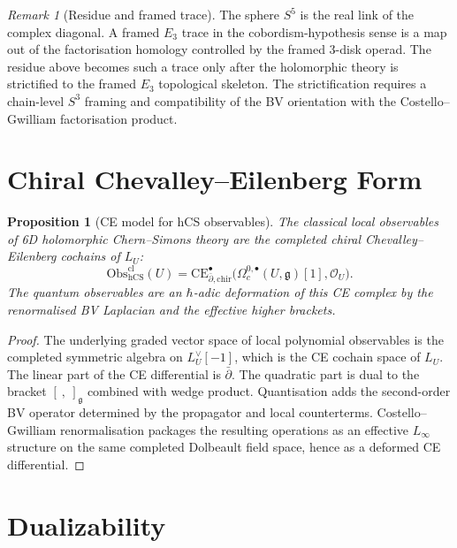 \documentclass[11pt]{amsart}
\providecommand{\hb}{\hbar}
\providecommand{\dbar}{\bar{\partial}}
\providecommand{\Obs}{\mathrm{Obs}}
\providecommand{\hCS}{\mathrm{hCS}}
\providecommand{\CE}{\mathrm{CE}}
\providecommand{\chir}{\mathrm{chir}}
\providecommand{\cO}{\mathcal{O}}
\providecommand{\g}{\mathfrak{g}}
\theoremstyle{plain}
\newtheorem{proposition}[theorem]{Proposition}
\theoremstyle{definition}
\theoremstyle{remark}
\newtheorem{remark}[theorem]{Remark}
\begin{document}
\begin{remark}[Residue and framed trace]\label{rem:residue-trace-scope}
The sphere $S^5$ is the real link of the complex diagonal. A framed
$E_3$ trace in the cobordism-hypothesis sense is a map out of the
factorisation homology controlled by the framed $3$-disk operad. The
residue above becomes such a trace only after the holomorphic theory is
strictified to the framed $E_3$ topological skeleton. The strictification
requires a chain-level $S^3$ framing and compatibility of the BV
orientation with the Costello--Gwilliam factorisation product.
\end{remark}

\section{Chiral Chevalley--Eilenberg Form}

\begin{proposition}[CE model for hCS observables]\label{prop:ce-model-hcs}
The classical local observables of 6D holomorphic Chern--Simons theory
are the completed chiral Chevalley--Eilenberg cochains of $L_U$:
\[
 \Obs_{\hCS}^{\mathrm{cl}}(U)
 =
 \CE^\bullet_{\dbar,\chir}
 \bigl(\Omega_c^{0,\bullet}(U,\g)[1],\cO_U\bigr).
\]
The quantum observables are an $\hb$-adic deformation of this CE complex
by the renormalised BV Laplacian and the effective higher brackets.
\end{proposition}

\begin{proof}
The underlying graded vector space of local polynomial observables is
the completed symmetric algebra on $L_U^\vee[-1]$, which is the CE
cochain space of $L_U$. The linear part of the CE differential is
$\dbar$. The quadratic part is dual to the bracket
$[\ ,\ ]_{\g}$ combined with wedge product. Quantisation adds the
second-order BV operator determined by the propagator and local
counterterms. Costello--Gwilliam renormalisation packages the resulting
operations as an effective $L_\infty$ structure on the same completed
Dolbeault field space, hence as a deformed CE differential.
\end{proof}

\section{Dualizability}
\end{document}
